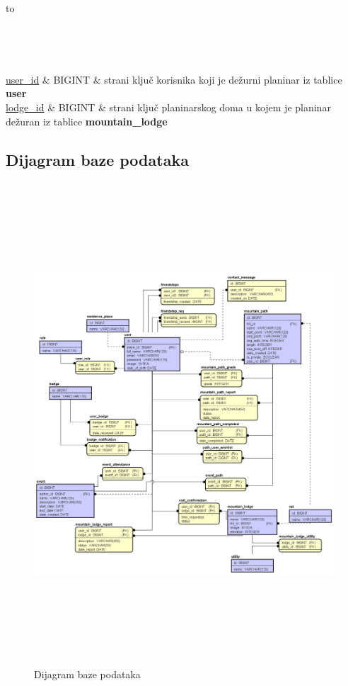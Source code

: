 			\begin{longtabu} to \textwidth {|X[6, l]|X[6, l]|X[20, l]|}
				
				\hline {}	 \\[3pt] \hline
				\endfirsthead
				
				\hline {}	 \\[3pt] \hline
				\endhead
				
				\hline 
				\endlastfoot
				
				\underline{user\_id} & BIGINT	& strani ključ korisnika koji je dežurni planinar iz tablice \textbf{user}	\\ \hline
				\underline{lodge\_id}	& BIGINT &   strani ključ planinarskog doma u kojem je planinar dežuran iz tablice \textbf{mountain\_lodge}	\\ \hline 
				
				
			\end{longtabu}
			\vspace{10mm}



			\subsection{Dijagram baze podataka}
				
				\begin{figure}[H]
					\includegraphics[scale=0.4, height=180mm]{slike/database.png} %
					\centering
					\caption{Dijagram baze podataka}
					\label{fig:dijagrambp}
				\end{figure}
			

